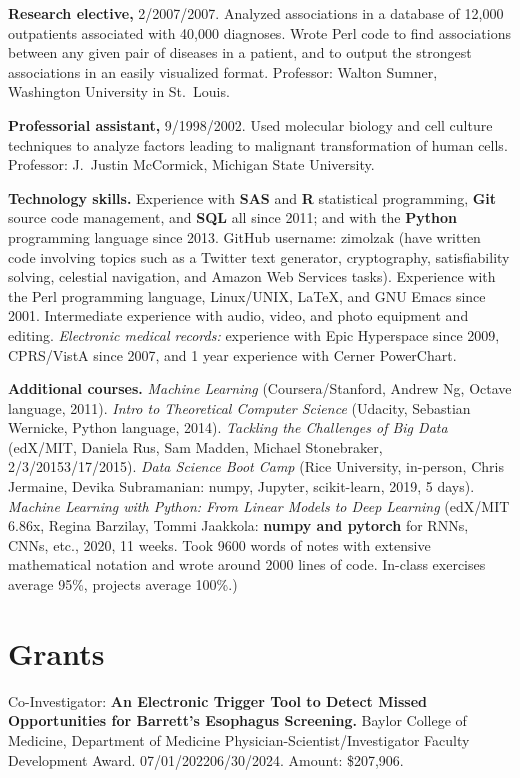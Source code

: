\documentclass[10pt]{article}
\begin{document}
\textbf{Research elective,} 2/2007/2007. Analyzed associations
in a database of 12,000 outpatients associated with 40,000 diagnoses.
Wrote Perl code to find associations between any given pair of
diseases in a patient, and to output the strongest associations in an
easily visualized format. Professor: Walton Sumner, Washington
University in St.\ Louis.

\textbf{Professorial assistant,} 9/1998/2002. Used molecular
biology and cell culture techniques to analyze factors leading to
malignant transformation of human cells. Professor: J.\ Justin
McCormick, Michigan State University.

\textbf{Technology skills.} Experience with \textbf{SAS} and
\textbf{R} statistical programming, \textbf{Git} source code
management, and \textbf{SQL} all since 2011; and with the
\textbf{Python} programming language since 2013. GitHub username:
zimolzak (have written code involving topics such as a Twitter text
generator, cryptography, satisfiability solving, celestial navigation,
and Amazon Web Services tasks). Experience with the Perl programming
language, Linux/UNIX, \LaTeX, and GNU Emacs since 2001. Intermediate
experience with audio, video, and photo equipment and editing.
\emph{Electronic medical records:} experience with Epic Hyperspace
since 2009, CPRS/VistA since 2007, and 1 year experience with Cerner
PowerChart.

\textbf{Additional courses.} \emph{Machine Learning}
(Coursera/Stanford, Andrew Ng, Octave language, 2011). \emph{Intro to
Theoretical Computer Science} (Udacity, Sebastian Wernicke, Python
language, 2014). \emph{Tackling the Challenges of Big Data} (edX/MIT,
Daniela Rus, Sam Madden, Michael Stonebraker,
2/3/2015\ndash{}3/17/2015). \emph{Data Science Boot Camp} (Rice
University, in-person, Chris Jermaine, Devika Subramanian: numpy,
Jupyter, scikit-learn, 2019, 5 days). \emph{Machine Learning with
Python: From Linear Models to Deep Learning} (edX/MIT 6.86x, Regina
Barzilay, Tommi Jaakkola: \textbf{numpy and pytorch} for RNNs, CNNs,
etc., 2020, 11 weeks. Took 9600 words of notes with extensive
mathematical notation and wrote around 2000 lines of code. In-class
exercises average 95\%, projects average 100\%.)




\section*{Grants}

Co-Investigator: \textbf{An Electronic Trigger Tool to Detect Missed
  Opportunities for Barrett’s Esophagus Screening.} Baylor College of
Medicine, Department of Medicine Physician-Scientist/Investigator
Faculty Development Award. 07/01/2022\ndash{}06/30/2024. Amount:
\$207,906.
\end{document}
